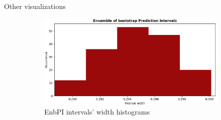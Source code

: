 \documentclass{beamer}
\begin{document}

\begin{frame}{Other visualizations}
    \vspace{-5mm}
    \begin{figure}[ht]
        \centering
        \begin{subfigure}[b]{0.32\textwidth}
            \centering
            \includegraphics[width=1.05\textwidth, height=1.1\textwidth]{Figures/timeseries/without-change-point/width-occurrence-timeseries-problem.png}
            \caption{EnbPI intervals' width histograms}
        \end{subfigure}
        \hfill
        \begin{subfigure}[b]{0.32\textwidth}
            \centering

\end{subfigure}
\end{figure}
\end{frame}
\end{document}
